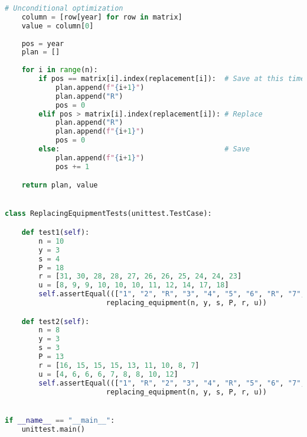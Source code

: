 \begin{lstlisting}[language=Python]
    # Unconditional optimization
    column = [row[year] for row in matrix]
    value = column[0]
    
    pos = year
    plan = []
    
    for i in range(n):
        if pos == matrix[i].index(replacement[i]):  # Save at this time and replace on the future
            plan.append(f"{i+1}")
            plan.append("R")
            pos = 0
        elif pos > matrix[i].index(replacement[i]): # Replace 
            plan.append("R")
            plan.append(f"{i+1}")
            pos = 0
        else:                                       # Save
            plan.append(f"{i+1}")
            pos += 1

    return plan, value


class ReplacingEquipmentTests(unittest.TestCase):

    def test1(self):
        n = 10
        y = 3
        s = 4
        P = 18
        r = [31, 30, 28, 28, 27, 26, 26, 25, 24, 24, 23]
        u = [8, 9, 9, 10, 10, 10, 11, 12, 14, 17, 18]
        self.assertEqual((["1", "2", "R", "3", "4", "5", "6", "R", "7", "8", "9", "10"], 169),
                        replacing_equipment(n, y, s, P, r, u))

    def test2(self):
        n = 8
        y = 3
        s = 3
        P = 13
        r = [16, 15, 15, 15, 13, 11, 10, 8, 7]
        u = [4, 6, 6, 6, 7, 8, 8, 10, 12]
        self.assertEqual((["1", "R", "2", "3", "4", "R", "5", "6", "7", "8"], 58),
                        replacing_equipment(n, y, s, P, r, u))


if __name__ == "__main__":
    unittest.main()
\end{lstlisting}
